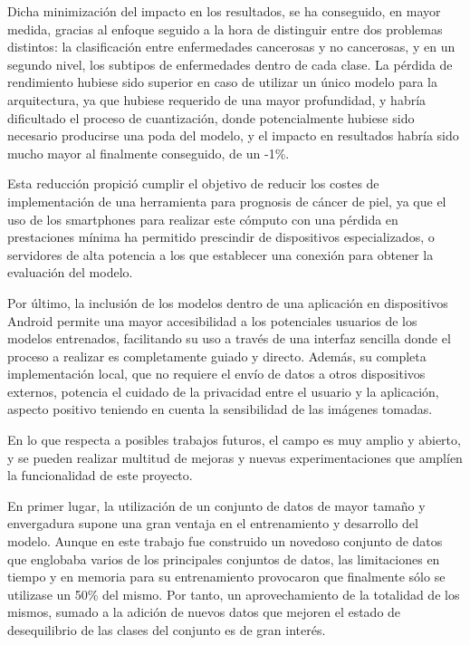 Dicha minimización del impacto en los resultados, se ha conseguido, en mayor medida, gracias al enfoque seguido a la hora de distinguir entre dos problemas distintos: la clasificación entre enfermedades cancerosas y no cancerosas, y en un segundo nivel, los subtipos de enfermedades dentro de cada clase. La pérdida de rendimiento hubiese sido superior en caso de utilizar un único modelo para la arquitectura, ya que hubiese requerido de una mayor profundidad, y habría dificultado el proceso de cuantización, donde potencialmente hubiese sido necesario producirse una poda del modelo, y el impacto en resultados habría sido mucho mayor al finalmente conseguido, de un -1\%. 

Esta reducción propició cumplir el objetivo de reducir los costes de implementación de una herramienta para prognosis de cáncer de piel, ya que el uso de los smartphones para realizar este cómputo con una pérdida en prestaciones mínima ha permitido prescindir de dispositivos especializados, o servidores de alta potencia a los que establecer una conexión para obtener la evaluación del modelo. 

Por último, la inclusión de los modelos dentro de una aplicación en dispositivos Android permite una mayor accesibilidad a los potenciales usuarios de los modelos entrenados, facilitando su uso a través de una interfaz sencilla donde el proceso a realizar es completamente guiado y directo. Además, su completa implementación local, que no requiere el envío de datos a otros dispositivos externos, potencia el cuidado de la privacidad entre el usuario y la aplicación, aspecto positivo teniendo en cuenta la sensibilidad de las imágenes tomadas.

En lo que respecta a posibles trabajos futuros, el campo es muy amplio y abierto, y se pueden realizar multitud de mejoras y nuevas experimentaciones que amplíen la funcionalidad de este proyecto.

En primer lugar, la utilización de un conjunto de datos de mayor tamaño y envergadura supone una gran ventaja en el entrenamiento y desarrollo del modelo. Aunque en este trabajo fue construido un novedoso conjunto de datos que englobaba varios de los principales conjuntos de datos, las limitaciones en tiempo y en memoria para su entrenamiento provocaron que finalmente sólo se utilizase un 50\% del mismo. Por tanto, un aprovechamiento de la totalidad de los mismos, sumado a la adición de nuevos datos que mejoren el estado de desequilibrio de las clases del conjunto es de gran interés.

